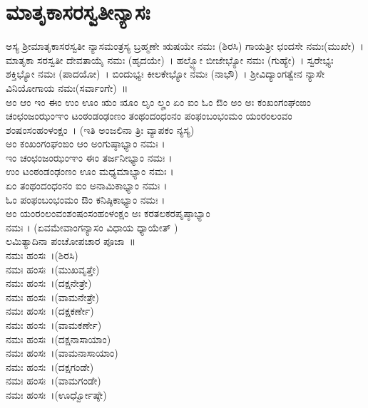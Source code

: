 \section{ಮಾತೃಕಾಸರಸ್ವತೀನ್ಯಾಸಃ}
ಅಸ್ಯ ಶ್ರೀಮಾತೃಕಾಸರಸ್ವತೀ ನ್ಯಾಸಮಂತ್ರಸ್ಯ ಬ್ರಹ್ಮಣೇ ಋಷಯೇ ನಮಃ (ಶಿರಸಿ) ಗಾಯತ್ರೀ ಛಂದಸೇ ನಮಃ(ಮುಖೇ)~। ಮಾತೃಕಾ ಸರಸ್ವತೀ ದೇವತಾಯೈ ನಮಃ (ಹೃದಯೇ)~। ಹಲ್ಭ್ಯೋ ಬೀಜೇಭ್ಯೋ ನಮಃ (ಗುಹ್ಯೇ)~। ಸ್ವರೇಭ್ಯಃ ಶಕ್ತಿಭ್ಯೋ ನಮಃ (ಪಾದಯೋ)~। ಬಿಂದುಭ್ಯಃ ಕೀಲಕೇಭ್ಯೋ ನಮಃ (ನಾಭೌ)~। ಶ್ರೀವಿದ್ಯಾಂಗತ್ವೇನ ನ್ಯಾಸೇ ವಿನಿಯೋಗಾಯ ನಮಃ(ಸರ್ವಾಂಗೇ)~॥\\
ಅಂ ಆಂ ಇಂ ಈಂ ಉಂ ಊಂ ಋಂ ೠಂ ಲೃಂ ಲೄಂ ಏಂ ಐಂ ಓಂ ಔಂ ಅಂ ಅಃ ಕಂಖಂಗಂಘಂಙಂ ಚಂಛಂಜಂಝಂಞಂ ಟಂಠಂಡಂಢಂಣಂ ತಂಥಂದಂಧಂನಂ ಪಂಫಂಬಂಭಂಮಂ ಯಂರಂಲಂವಂ ಶಂಷಂಸಂಹಂಳಂಕ್ಷಂ~। (ಇತಿ ಅಂಜಲಿನಾ ತ್ರಿಃ ವ್ಯಾಪಕಂ ನ್ಯಸ್ಯ)\\
 ಅಂ ಕಂಖಂಗಂಘಂಙಂ ಆಂ ಅಂಗುಷ್ಠಾಭ್ಯಾಂ ನಮಃ ।\\
 ಇಂ ಚಂಛಂಜಂಝಂಞಂ ಈಂ ತರ್ಜನೀಭ್ಯಾಂ ನಮಃ ।\\
 ಉಂ ಟಂಠಂಡಂಢಂಣಂ ಊಂ ಮಧ್ಯಮಾಭ್ಯಾಂ ನಮಃ ।\\
 ಏಂ ತಂಥಂದಂಧಂನಂ ಐಂ ಅನಾಮಿಕಾಭ್ಯಾಂ ನಮಃ ।\\
 ಓಂ ಪಂಫಂಬಂಭಂಮಂ ಔಂ ಕನಿಷ್ಠಿಕಾಭ್ಯಾಂ ನಮಃ ।\\
 ಅಂ ಯಂರಂಲಂವಂಶಂಷಂಸಂಹಂಳಂಕ್ಷಂ ಅಃ ಕರತಲಕರಪೃಷ್ಠಾಭ್ಯಾಂ\\ ನಮಃ ।
(ಏವಮೇವಾಂಗನ್ಯಾಸಂ ವಿಧಾಯ ಧ್ಯಾಯೇತ್ )
\eject
{}\\
ಲಮಿತ್ಯಾದಿನಾ ಪಂಚೋಪಚಾರ ಪೂಜಾ~॥\\
 ನಮಃ ಹಂಸಃ~।(ಶಿರಸಿ)\\
 ನಮಃ ಹಂಸಃ~।(ಮುಖವೃತ್ತೇ)\\
 ನಮಃ ಹಂಸಃ~।(ದಕ್ಷನೇತ್ರೇ)\\
 ನಮಃ ಹಂಸಃ~।(ವಾಮನೇತ್ರೇ)\\
 ನಮಃ ಹಂಸಃ~।(ದಕ್ಷಕರ್ಣೇ)\\
 ನಮಃ ಹಂಸಃ~।(ವಾಮಕರ್ಣೇ)\\
 ನಮಃ ಹಂಸಃ~।(ದಕ್ಷನಾಸಾಯಾಂ)\\
 ನಮಃ ಹಂಸಃ~।(ವಾಮನಾಸಾಯಾಂ)\\
 ನಮಃ ಹಂಸಃ~।(ದಕ್ಷಗಂಡೇ)\\
 ನಮಃ ಹಂಸಃ~।(ವಾಮಗಂಡೇ)\\
 ನಮಃ ಹಂಸಃ~।(ಊರ್ಧ್ವೋಷ್ಠೇ)\\
